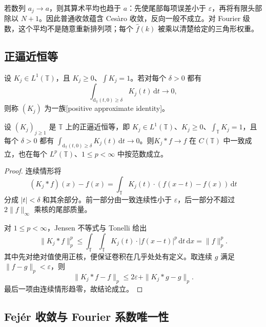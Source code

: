 若数列 \(a_j\to a\)，则其算术平均也趋于 \(a\)：先使尾部每项误差小于 \(\varepsilon\)，再将有限头部除以 \(N+1\)。因此普通收敛蕴含 Cesàro 收敛，反向一般不成立。对 Fourier 级数，这个平均不是随意重新排列项；每个 \(\widehat f(k)\) 被乘以清楚给定的三角形权重。

\subsection{正逼近恒等}
\label{b2:subsec:020403}

\begin{definition}\label{b2:def:02-positive-identity}
设 \(K_j\in L^1(\mathbb T)\)，且 \(K_j\geq0\)、\(\int K_j=1\)。若对每个 \(\delta>0\) 都有
\[
 \int_{\mathrm{d}_{\mathbb T}(t,0)\geq\delta}K_j(t)\,\mathrm{d}t\longrightarrow0,
\]
则称 \((K_j)\) 为一族[positive approximate identity]。
\end{definition}

\begin{proposition}\label{b2:prop:02-positive-approximation}
设 \((K_j)_{j\geq1}\) 是 \(\mathbb T\) 上的正逼近恒等，即 \(K_j\in L^1(\mathbb T)\)、\(K_j\geq0\)、\(\int_{\mathbb T}K_j=1\)，且每个 \(\delta>0\) 都有 \(\int_{\mathrm d_{\mathbb T}(t,0)\geq\delta}K_j(t)\,\mathrm dt\to0\)。则\(K_j*f\to f\) 在 \(C(\mathbb T)\) 中一致成立，也在每个 \(L^p(\mathbb T)\)、\(1\leq p<\infty\) 中按范数成立。
\end{proposition}
\begin{proof}
连续情形将
\[
 (K_j*f)(x)-f(x)=\int_{\mathbb T}K_j(t)\cdot(f(x-t)-f(x))\,\mathrm{d}t
\]
分成 \(|t|<\delta\) 和其余部分。前一部分由一致连续性小于 \(\varepsilon\)，后一部分不超过 \(2\|f\|_\infty\) 乘核的尾部质量。

对 \(1\leq p<\infty\)，Jensen 不等式与 Tonelli 给出
\[
 \|K_j*f\|_p^p
 \leq\int_{\mathbb T}\int_{\mathbb T}K_j(t)\cdot|f(x-t)|^p\,\mathrm{d}t\,\mathrm{d}x
 =\|f\|_p^p.
\]
其中先对绝对值使用正核，便保证卷积在几乎处处有定义。取连续 \(g\) 满足 \(\|f-g\|_p<\varepsilon\)，则
\[
 \|K_j*f-f\|_p\leq2\varepsilon+\|K_j*g-g\|_p.
\]
最后一项由连续情形趋零，故结论成立。
\end{proof}

\subsection{Fejér 收敛与 Fourier 系数唯一性}
\label{b2:subsec:020404}

